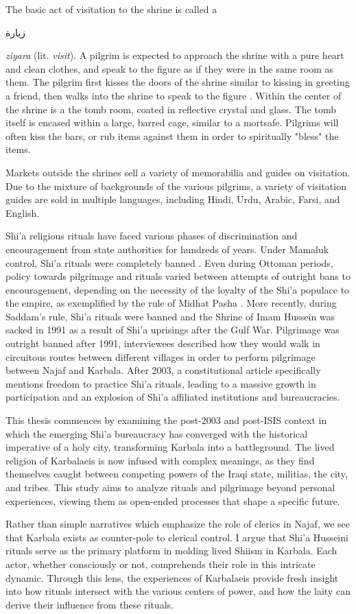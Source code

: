 The basic act of visitation to the shrine is called a \begin{Arabic}
    زيارة
\end{Arabic}\emph{ziyara} (lit. \emph{visit}). A pilgrim is expected to approach the shrine with a pure heart and clean clothes, and speak to the figure as if they were in the same room as them. The pilgrim first kisses the doors of the shrine similar to kissing in greeting a friend, then walks into the shrine to speak to the figure \cite{qisa_publications_illustrated_2018}. Within the center of the shrine is a the tomb room, coated in reflective crystal and glass. The tomb itself is encased within a large, barred cage, similar to a mortsafe. Pilgrims will often kiss the bars, or rub items against them in order to spiritually "bless" the items. 

Markets outside the shrines sell a variety of memorabilia and guides on visitation. Due to the mixture of backgrounds of the various pilgrims, a variety of visitation guides are sold in multiple languages, including Hindi, Urdu, Arabic, Farsi, and English. 

Shi'a religious rituals have faced various phases of discrimination and encouragement from state authorities for hundreds of years. Under Mamaluk control, Shi'a rituals were completely banned \cite{yitzhak_nakash_attempt_1993}. Even during Ottoman periods, policy towards pilgrimage and rituals varied between attempts of outright bans to encouragement, depending on the necessity of the loyalty of the Shi'a populace to the empire, as exemplified by the rule of Midhat Pasha \cite{aghaie_martyrs_2004}. More recently, during Saddam's rule, Shi'a rituals were banned and the Shrine of Imam Hussein was sacked in 1991 as a result of Shi'a uprisings after the Gulf War. Pilgrimage was outright banned after 1991, interviewees described how they would walk in circuitous routes between different villages in order to perform pilgrimage between Najaf and Karbala. After 2003, a constitutional article specifically mentions freedom to practice Shi'a rituals, leading to a massive growth in participation and an explosion of Shi'a affiliated institutions and bureaucracies. 

This thesis commences by examining the post-2003 and post-ISIS context in which the emerging Shi'a bureaucracy has converged with the historical imperative of a holy city, transforming Karbala into a battleground. The lived religion of Karbalaeis is now infused with complex meanings, as they find themselves caught between competing powers of the Iraqi state, militias, the city, and tribes. This study aims to analyze rituals and pilgrimage beyond personal experiences, viewing them as open-ended processes that shape a specific future.

Rather than simple narratives which emphasize the role of clerics in Najaf, we see that Karbala exists as counter-pole to clerical control. I argue that Shi'a Husseini rituals serve as the primary platform in molding lived Shiism in Karbala.  Each actor, whether consciously or not, comprehends their role in this intricate dynamic. Through this lens, the experiences of Karbalaeis provide fresh insight into how rituals intersect with the various centers of power, and how the laity can derive their influence from these rituals. 